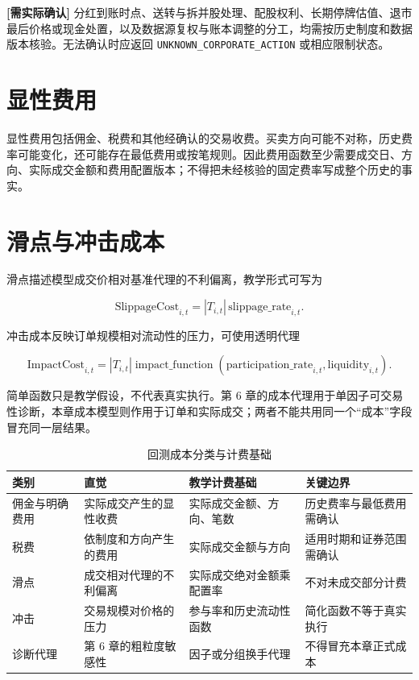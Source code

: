 \begin{confirmbox}
\textbf{[需实际确认]} 分红到账时点、送转与拆并股处理、配股权利、长期停牌估值、退市最后价格或现金处置，以及数据源复权与账本调整的分工，均需按历史制度和数据版本核验。无法确认时应返回 \texttt{UNKNOWN\_CORPORATE\_ACTION} 或相应限制状态。
\end{confirmbox}

\section{显性费用}

显性费用包括佣金、税费和其他经确认的交易收费。买卖方向可能不对称，历史费率可能变化，还可能存在最低费用或按笔规则。因此费用函数至少需要成交日、方向、实际成交金额和费用配置版本；不得把未经核验的固定费率写成整个历史的事实。

\section{滑点与冲击成本}

滑点描述模型成交价相对基准代理的不利偏离，教学形式可写为

\begin{equation}
  \mathrm{SlippageCost}_{i,t}
  =\left|T_{i,t}\right|\,\mathrm{slippage\_rate}_{i,t}.
  \label{eq:ch10-slippage}
\end{equation}

冲击成本反映订单规模相对流动性的压力，可使用透明代理

\begin{equation}
  \mathrm{ImpactCost}_{i,t}
  =\left|T_{i,t}\right|
  \operatorname{impact\_function}
  \left(\mathrm{participation\_rate}_{i,t},
  \mathrm{liquidity}_{i,t}\right).
  \label{eq:ch10-impact}
\end{equation}

简单函数只是教学假设，不代表真实执行。第 6 章的成本代理用于单因子可交易性诊断，本章成本模型则作用于订单和实际成交；两者不能共用同一个“成本”字段冒充同一层结果。

\begin{table}[htbp]
  \centering
  \small
  \caption{回测成本分类与计费基础}
  \label{tab:ch10-cost-classes}
  \begin{tabularx}{\textwidth}{p{2.5cm} p{3.8cm} p{3.5cm} Y}
    \toprule
    类别 & 直觉 & 教学计费基础 & 关键边界 \\
    \midrule
    佣金与明确费用 & 实际成交产生的显性收费 & 实际成交金额、方向、笔数 & 历史费率与最低费用需确认 \\
    税费 & 依制度和方向产生的费用 & 实际成交金额与方向 & 适用时期和证券范围需确认 \\
    滑点 & 成交相对代理的不利偏离 & 实际成交绝对金额乘配置率 & 不对未成交部分计费 \\
    冲击 & 交易规模对价格的压力 & 参与率和历史流动性函数 & 简化函数不等于真实执行 \\
    诊断代理 & 第 6 章的粗粒度敏感性 & 因子或分组换手代理 & 不得冒充本章正式成本 \\
    \bottomrule
  \end{tabularx}
\end{table}

